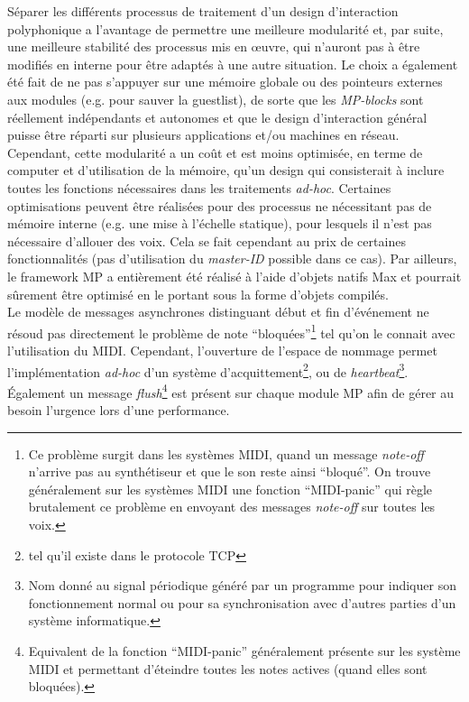 \noindent Séparer les différents processus de traitement d'un design d'interaction polyphonique a l'avantage de permettre une meilleure modularité et, par suite, une meilleure stabilité des processus mis en œuvre, qui n'auront pas à être modifiés en interne pour être adaptés à une autre situation. Le choix a également été fait de ne pas s'appuyer sur une mémoire globale ou des pointeurs externes aux modules (e.g. pour sauver la guestlist), de sorte que les \textit{MP-blocks} sont réellement indépendants et autonomes et que le design d'interaction général puisse être réparti sur plusieurs applications et/ou machines en réseau.\\
\indent Cependant, cette modularité a un coût et est moins optimisée, en terme de computer et d'utilisation de la mémoire, qu'un design qui consisterait à inclure toutes les fonctions nécessaires dans les traitements \textit{ad-hoc}. Certaines optimisations peuvent être réalisées pour des processus ne nécessitant pas de mémoire interne (e.g. une mise à l'échelle statique), pour lesquels il n'est pas nécessaire d'allouer des voix. Cela se fait cependant au prix de certaines fonctionnalités (pas d'utilisation du \textit{master-ID} possible dans ce cas). Par ailleurs, le framework MP a entièrement été réalisé à l'aide d'objets natifs Max et pourrait sûrement être optimisé en le portant sous la forme d'objets compilés.\\
\indent Le modèle de messages asynchrones distinguant début et fin d'événement ne résoud pas directement le problème de note ``bloquées''\footnote{Ce problème surgit dans les systèmes MIDI, quand un message \textit{note-off} n'arrive pas au synthétiseur et que le son reste ainsi ``bloqué''. On trouve généralement sur les systèmes MIDI une fonction ``MIDI-panic'' qui règle brutalement ce problème en envoyant des messages \textit{note-off} sur toutes les voix.} tel qu'on le connait avec l'utilisation du \gls{MIDI}. Cependant, l'ouverture de l'espace de nommage permet l'implémentation \textit{ad-hoc} d'un système d'acquittement\footnote{tel qu'il existe dans le protocole \gls{TCP}}, ou de \textit{heartbeat}\footnote{Nom donné au signal périodique généré par un programme pour indiquer son fonctionnement normal ou pour sa synchronisation avec d'autres parties d'un système informatique.}. Également un message \textit{flush}\footnote{Equivalent de la fonction ``MIDI-panic'' généralement présente sur les système MIDI et permettant d'éteindre toutes les notes actives (quand elles sont bloquées).} est présent sur chaque module MP afin de gérer au besoin l'urgence lors d'une performance.


